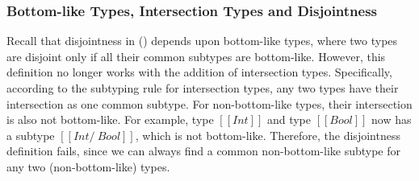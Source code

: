 
\subsubsection*{Bottom-like Types, Intersection Types and Disjointness}
\noindent %
Recall that disjointness in  () depends
upon bottom-like types, where two types are disjoint only if all their common
subtypes are bottom-like. However, this definition no longer works with the
addition of intersection types. Specifically, according to the subtyping rule
for intersection types, any two types have their intersection as one common subtype.
For non-bottom-like types, their intersection is also not bottom-like. For
example, type $[[Int]]$ and type $[[Bool]]$ now has a subtype $[[Int /\ Bool]]$,
which is not bottom-like. Therefore, the disjointness definition fails, since we
can always find a common non-bottom-like subtype for any two (non-bottom-like)
types.

\begin{comment}
Reader may think at this point to add intersection of non-overlapping types such as $[[Int /\ Bool]]$
in bottom-like types to solve the problem. A trivial and intuitive approach to think of is:

\begin{center}
\drule[]{bl-andsub}
\end{center}

\noindent \Rref{bl-andsub} states that if two types $[[A]]$ and $[[B]]$
are not subtypes of each other (i.e. non-overlapping) then intersection of
such types $[[A /\ B]]$ is bottom-like.
\Rref{bl-andsub} works for simple cases such as $[[Int]]$ and $[[Bool]]$.
But it fails if  $[[A]]$ = $[[Int /\ Bool]]$ and 
$[[B]]$ = $[[Int /\ Bool]]$.
Because $[[A]]$ ($[[Int /\ Bool]]$) and $[[B]]$ ($[[Int /\ Bool]]$) are subtypes
of each other and are not bottom-like as per \rref{bl-andsub}.
So, naive addition of \rref{bl-andsub} skips potential bottem-like types.
Another alternative may be:

\begin{center}
\drule[]{bl-anddisj}
\end{center}

\noindent \Rref{bl-anddisj} states that if two types $[[A]]$ and $[[B]]$ are disjoint,
then intersection of such types $[[A /\ B]]$ is bottom-like.
But \rref{bl-anddisj} imposes additional complexities of mutually
dependent definitions among disjointness and bottom-like.
This makes completeness challenging or even impossible to prove.
\end{comment}
